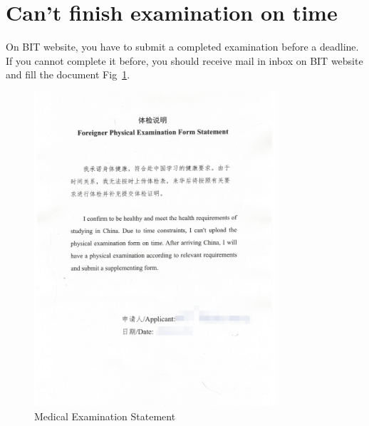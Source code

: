\section{Can't finish examination on time}

On BIT website, you have to submit a completed examination before a deadline.
If you cannot complete it before,
you should receive mail in inbox on BIT website and fill the document Fig~\ref{fig:ru_med_state}.


\begin{figure}[htpb]
    \centering
    \includegraphics[width=0.8\textwidth]{01_russia/imgs/medical_statement}
    \caption{\centering Medical Examination Statement}
    \label{fig:ru_med_state}
\end{figure}
